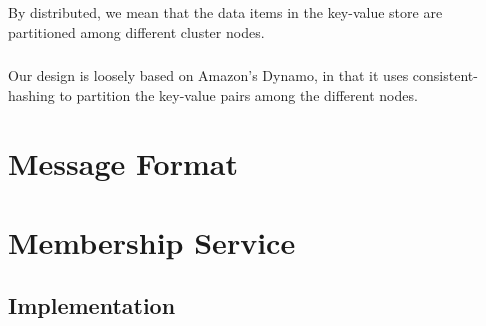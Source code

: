 \documentclass{report}
\begin{document}
			\paragraph{}By distributed, we mean that the data items in the key-value
			store are partitioned among different cluster nodes.
			
			\paragraph{} Our design is loosely based on Amazon's Dynamo, in that it
			uses consistent-hashing to partition the key-value pairs among the 
			different nodes.
	
	\chapter{Message Format}

			\paragraph{}
	        
	        \paragraph{}

	\chapter{Membership Service}
	
	        \paragraph{}
	        
	        \paragraph{}

			\section{Implementation}
	
				\paragraph{}
				
				\paragraph{}
\end{document}
